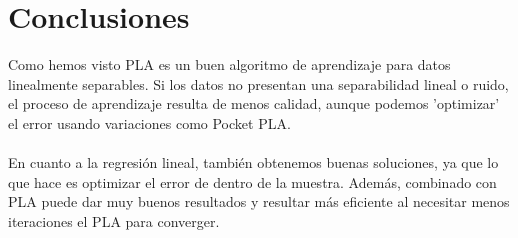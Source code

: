 	\section{Conclusiones}
	Como hemos visto PLA es un buen algoritmo de aprendizaje para datos linealmente separables. Si los datos no presentan una separabilidad lineal o ruido, el proceso de aprendizaje resulta de menos calidad, aunque podemos 'optimizar' el error usando variaciones como Pocket PLA. 
	\\
	\\
	En cuanto a la regresión lineal, también obtenemos buenas soluciones, ya que lo que hace es optimizar el error de dentro de la muestra. Además, combinado con PLA puede dar muy buenos resultados y resultar más eficiente al necesitar menos iteraciones el PLA para converger.

